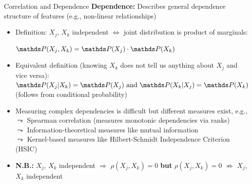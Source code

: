 \documentclass[11pt,compress,t,notes=noshow, aspectratio=169, xcolor=table]{beamer}
\begin{document}
\begin{frame}{Correlation and Dependence}
\textbf{Dependence:} Describes general dependence structure of features (e.g., non-linear relationships)

\begin{itemize}[<+->]
\item Definition: $X_j$, $X_k$ independent $\Leftrightarrow$ joint distribution is product of marginals:\\ \vspace{5pt}
\centerline{$\P(X_j, X_k) = \P(X_j) \cdot \P(X_k)$}
\vspace{5pt}
\item Equivalent definition (knowing $X_k$ does not tell us anything about $X_j$ and vice versa): \\
\vspace{5pt}
\phantom{AAA} $\P(X_j|X_k) = \P(X_j) \text{ and } \P(X_k|X_j) = \P(X_k)$ \hfill (follows from conditional probability) \phantom{AAA}
\vspace{5pt}
\item Measuring complex dependencies is difficult but different measures exist, e.g., \\
$\leadsto$ Spearman correlation (measures monotonic dependencies via ranks) \\
$\leadsto$ Information-theoretical measures like mutual information \\
$\leadsto$ Kernel-based measures like Hilbert-Schmidt Independence Criterion (HSIC)
\item \textbf{N.B.:} $X_j$, $X_k$ independent $\Rightarrow$ $\rho(X_j, X_k) = 0$ \textbf{but} $\rho(X_j, X_k) = 0$ $\nRightarrow$ $X_j$, $X_k$  independent
\end{itemize}
\end{frame}
\end{document}

